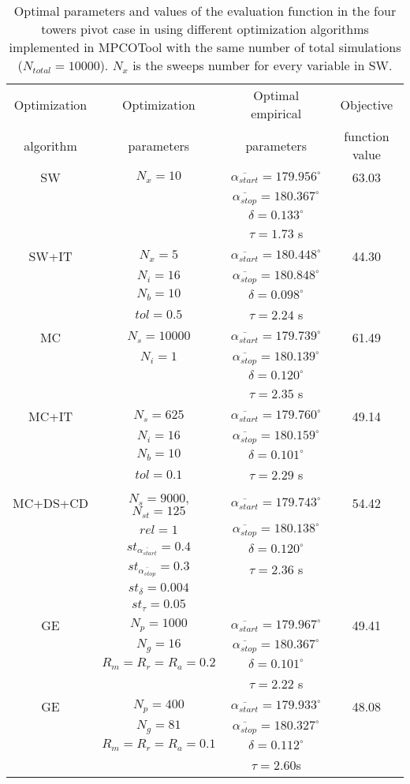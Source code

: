 \documentclass[review,authoryear]{elsarticle}
\newcommand{\TABLE}[5]
{
	\begin{table}[ht!]
		\centering
		\caption{#4.\label{#5}}
		#1
		\begin{tabular}{#2}
			#3
		\end{tabular}
	\end{table}
}
\begin{document}
\TABLE{\scriptsize}{cccc}
{
	Optimization & Optimization & Optimal empirical & Objective
	\\ algorithm & parameters & parameters & function value
	\\ \hline
	SW & $N_x=10$ & $\overline{\alpha_{start}}=179.956^\circ$
	& 63.03
	\\ & & $\overline{\alpha_{stop}}=180.367^\circ$
	\\ & & $\delta=0.133^\circ$
	\\ & & $\tau=1.73$ s
	\\ \hline
	SW+IT & $N_x=5$ & $\overline{\alpha_{start}}=180.448^\circ$
	& 44.30
	\\ & $N_i=16$ & $\overline{\alpha_{stop}}=180.848^\circ$
	\\ & $N_b=10$ & $\delta=0.098^\circ$
	\\ & $tol=0.5$ & $\tau=2.24$ s
	\\ \hline
	MC & $N_s=10000$
	& $\overline{\alpha_{start}}=179.739^\circ$ & 61.49
	\\ & $N_i=1$ & $\overline{\alpha_{stop}}=180.139^\circ$
	\\ & & $\delta=0.120^\circ$
	\\ & & $\tau=2.35$ s
	\\ \hline
	MC+IT & $N_s=625$
	& $\overline{\alpha_{start}}=179.760^\circ$ & 49.14
	\\ & $N_i=16$ & $\overline{\alpha_{stop}}=180.159^\circ$
	\\ & $N_b=10$ & $\delta=0.101^\circ$
	\\ & $tol=0.1$ & $\tau=2.29$ s
	\\ \hline
	MC+DS+CD & $N_s=9000$, $N_{st}=125$
	& $\overline{\alpha_{start}}=179.743^\circ$ & 54.42
	\\ & $rel=1$ & $\overline{\alpha_{stop}}=180.138^\circ$
	\\ & $st_{\overline{\alpha_{start}}}=0.4$ & $\delta=0.120^\circ$
	\\ & $st_{\overline{\alpha_{stop}}}=0.3$ & $\tau=2.36$ s
	\\ & $st_\delta=0.004$
	\\ & $st_\tau=0.05$
	\\ \hline
	GE & $N_p=1000$ & $\overline{\alpha_{start}}=179.967^\circ$
	& 49.41
	\\ & $N_g=16$ & $\overline{\alpha_{stop}}=180.367^\circ$
	\\ & $R_m=R_r=R_a=0.2$ & $\delta=0.101^\circ$
	\\ & & $\tau=2.22$ s
	\\ \hline
	GE & $N_p=400$ & $\overline{\alpha_{start}}=179.933^\circ$
	& 48.08
	\\ & $N_g=81$ & $\overline{\alpha_{stop}}=180.327^\circ$
	\\ & $R_m=R_r=R_a=0.1$ & $\delta=0.112^\circ$
	\\ & & $\tau=2.60$s
	\\ \hline
}{Optimal parameters and values of the evaluation function in the four towers pivot case in \citet{Ouazaa15} using different optimization algorithms implemented in MPCOTool with the same number of total simulations ($N_{total}=10000$). $N_x$ is the sweeps number for every variable in SW}{TabPivot}
\end{document}
